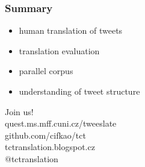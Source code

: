 \documentclass[12pt]{beamer}
\begin{document}
\begin{frame}
	\frametitle{Summary}
	\begin{itemize}
		\item \textcolor{TCTwhite}{\Large human translation of tweets}
		\item \textcolor{TCTwhite}{\Large translation evaluation}
		\item \textcolor{TCTwhite}{\Large parallel corpus}
		\item \textcolor{TCTwhite}{\Large understanding of tweet structure}
	\end{itemize}
\end{frame}

\begin{frame}
	\begin{center}
		\textcolor{TCTsilver}{\Huge Join us!}
		\\[0.9cm]
		\textcolor{TCTsilver}{\Huge quest.ms.mff.cuni.cz/tweeslate}
		\\[0.3cm]
		\textcolor{TCTsilver}{\Huge github.com/cifkao/tct }
		\\[0.3cm]
		\textcolor{TCTsilver}{\Huge tctranslation.blogspot.cz}
		\\[0.3cm]
		\textcolor{TCTsilver}{\Huge $@$tctranslation}
	\end{center}
\end{frame}
\end{document}
